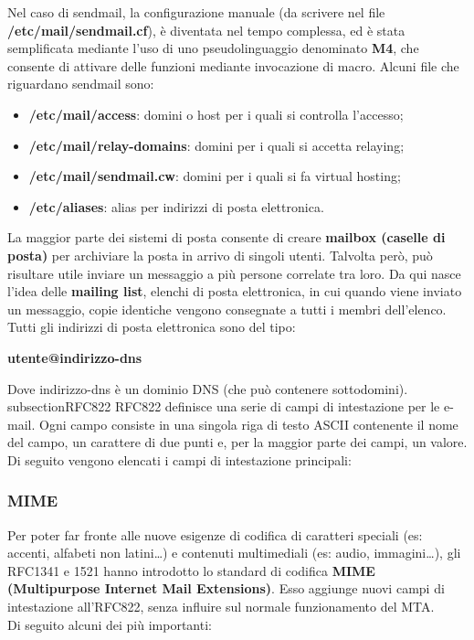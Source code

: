 Nel caso di sendmail, la configurazione manuale (da scrivere nel file
\textbf{/etc/mail/sendmail.cf}), è diventata nel tempo complessa, ed è stata semplificata
mediante l’uso di uno pseudolinguaggio denominato \textbf{M4}, che consente di attivare delle
funzioni mediante invocazione di macro. Alcuni file che riguardano sendmail sono:
\begin{itemize}
    \item \textbf{/etc/mail/access}: domini o host per i quali si controlla l’accesso;
    \item \textbf{/etc/mail/relay-domains}: domini per i quali si accetta relaying;
    \item \textbf{/etc/mail/sendmail.cw}: domini per i quali si fa virtual hosting;
    \item \textbf{/etc/aliases}: alias per indirizzi di posta elettronica.
\end{itemize}

La maggior parte dei sistemi di posta consente di creare \textbf{mailbox (caselle di posta)} per
archiviare la posta in arrivo di singoli utenti. Talvolta però, può risultare utile inviare un
messaggio a più persone correlate tra loro. Da qui nasce l’idea delle \textbf{mailing list}, elenchi di
posta elettronica, in cui quando viene inviato un messaggio, copie identiche vengono
consegnate a tutti i membri dell’elenco. Tutti gli indirizzi di posta elettronica sono del tipo:
\begin{center}
    \textbf{utente@indirizzo-dns}
\end{center}
Dove indirizzo-dns è un dominio DNS (che può contenere sottodomini).
    subsection{RFC822}
    RFC822 definisce una serie di campi di intestazione per le e-mail. Ogni campo consiste in una
    singola riga di testo ASCII contenente il nome del campo, un carattere di due punti e, per la
    maggior parte dei campi, un valore.\\
    Di seguito vengono elencati i campi di intestazione principali:

        \subsubsection{MIME}
        Per poter far fronte alle nuove esigenze di codifica di caratteri speciali (es: accenti, alfabeti non
        latini…) e contenuti multimediali (es: audio, immagini…), gli RFC1341 e 1521 hanno introdotto
        lo standard di codifica \textbf{MIME (Multipurpose Internet Mail Extensions)}. Esso aggiunge nuovi
        campi di intestazione all’RFC822, senza influire sul normale funzionamento del MTA.\\
        Di seguito alcuni dei più importanti:

